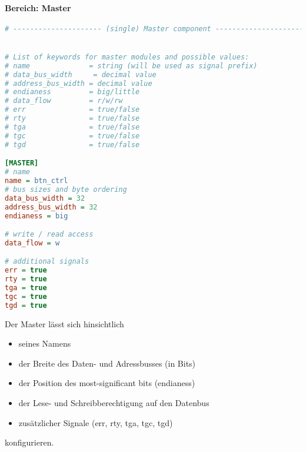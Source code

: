 \documentclass{article}
\newcommand{\nl}{\leavevmode\newline}
\begin{document}
\paragraph{Bereich: Master}\nl
\begin{lstlisting}[language={Ini},frame=single]
# --------------------- (single) Master component ---------------------


# List of keywords for master modules and possible values:
# name              = string (will be used as signal prefix)
# data_bus_width     = decimal value
# address_bus_width = decimal value
# endianess         = big/little
# data_flow         = r/w/rw
# err               = true/false
# rty               = true/false
# tga               = true/false
# tgc               = true/false
# tgd               = true/false

[MASTER]
# name
name = btn_ctrl
# bus sizes and byte ordering
data_bus_width = 32
address_bus_width = 32
endianess = big

# write / read access
data_flow = w

# additional signals
err = true
rty = true
tga = true
tgc = true
tgd = true
\end{lstlisting}
Der Master lässt sich hinsichtlich 
\begin{itemize}
\item seines Namens
\item der Breite des Daten- und Adressbusses (in Bits)
\item der Position des most-significant bits (endianess)
\item der Lese- und Schreibberechtigung auf den Datenbus
\item zusätzlicher Signale (err, rty, tga, tgc, tgd)
\end{itemize}
konfigurieren.
\newpage
\end{document}
